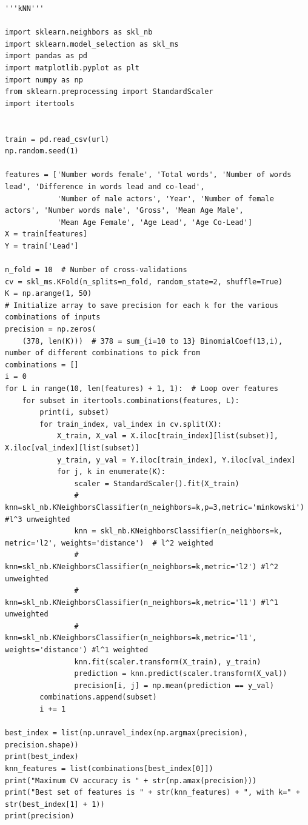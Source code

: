 \documentclass{article}
\begin{document}
\begin{verbatim}
'''kNN'''

import sklearn.neighbors as skl_nb
import sklearn.model_selection as skl_ms
import pandas as pd
import matplotlib.pyplot as plt
import numpy as np
from sklearn.preprocessing import StandardScaler
import itertools


train = pd.read_csv(url)
np.random.seed(1)

features = ['Number words female', 'Total words', 'Number of words lead', 'Difference in words lead and co-lead',
            'Number of male actors', 'Year', 'Number of female actors', 'Number words male', 'Gross', 'Mean Age Male',
            'Mean Age Female', 'Age Lead', 'Age Co-Lead']
X = train[features]
Y = train['Lead']

n_fold = 10  # Number of cross-validations
cv = skl_ms.KFold(n_splits=n_fold, random_state=2, shuffle=True)
K = np.arange(1, 50)
# Initialize array to save precision for each k for the various combinations of inputs
precision = np.zeros(
    (378, len(K)))  # 378 = sum_{i=10 to 13} BinomialCoef(13,i), number of different combinations to pick from
combinations = []
i = 0
for L in range(10, len(features) + 1, 1):  # Loop over features
    for subset in itertools.combinations(features, L):
        print(i, subset)
        for train_index, val_index in cv.split(X):
            X_train, X_val = X.iloc[train_index][list(subset)], X.iloc[val_index][list(subset)]
            y_train, y_val = Y.iloc[train_index], Y.iloc[val_index]
            for j, k in enumerate(K):
                scaler = StandardScaler().fit(X_train)
                # knn=skl_nb.KNeighborsClassifier(n_neighbors=k,p=3,metric='minkowski') #l^3 unweighted
                knn = skl_nb.KNeighborsClassifier(n_neighbors=k, metric='l2', weights='distance')  # l^2 weighted
                # knn=skl_nb.KNeighborsClassifier(n_neighbors=k,metric='l2') #l^2 unweighted
                # knn=skl_nb.KNeighborsClassifier(n_neighbors=k,metric='l1') #l^1 unweighted
                # knn=skl_nb.KNeighborsClassifier(n_neighbors=k,metric='l1', weights='distance') #l^1 weighted
                knn.fit(scaler.transform(X_train), y_train)
                prediction = knn.predict(scaler.transform(X_val))
                precision[i, j] = np.mean(prediction == y_val)
        combinations.append(subset)
        i += 1

best_index = list(np.unravel_index(np.argmax(precision), precision.shape))
print(best_index)
knn_features = list(combinations[best_index[0]])
print("Maximum CV accuracy is " + str(np.amax(precision)))
print("Best set of features is " + str(knn_features) + ", with k=" + str(best_index[1] + 1))
print(precision)


\end{verbatim}
\end{document}
